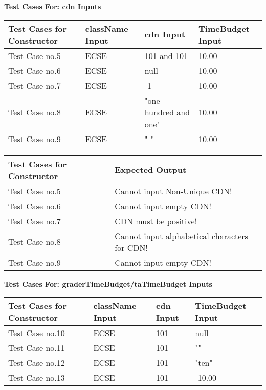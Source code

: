 \documentclass[12pt]{report}
\begin{document}
	\textbf{Test Cases For: cdn Inputs}
	\begin{flushleft}
		\begin{tabular}{ | l | l | l | l | }
			\hline
			Test Cases for Constructor & className Input & cdn Input & TimeBudget Input \\ \hline
			Test Case no.5 & ECSE & 101 and 101 & 10.00 \\ \hline
			Test Case no.6 & ECSE & null & 10.00 \\ \hline
			Test Case no.7 & ECSE & -1 & 10.00 \\ \hline
			Test Case no.8 & ECSE & "one hundred and one" & 10.00 \\ \hline
			Test Case no.9 & ECSE & " " & 10.00 \\ \hline
		\end{tabular}
	\end{flushleft}
	
	\begin{flushleft}
		\begin{tabular}{ | l | l | }
			\hline
			Test Cases for Constructor & Expected Output \\ \hline
			Test Case no.5 & Cannot input Non-Unique CDN! \\ \hline
			Test Case no.6 & Cannot input empty CDN! \\ \hline
			Test Case no.7 & CDN must be positive! \\ \hline
			Test Case no.8 & Cannot input alphabetical characters for CDN!  \\ \hline
			Test Case no.9 & Cannot input empty CDN!  \\ \hline			
		\end{tabular}
	\end{flushleft}

	\textbf{Test Cases For: graderTimeBudget/taTimeBudget Inputs} 
	\begin{flushleft}
		\begin{tabular}{ | l | l | l | l | }
			\hline
			Test Cases for Constructor & className Input & cdn Input & TimeBudget Input \\ \hline
			Test Case no.10 & ECSE & 101 & null \\ \hline
			Test Case no.11 & ECSE & 101 & "" \\ \hline
			Test Case no.12 & ECSE & 101 & "ten" \\ \hline
			Test Case no.13 & ECSE & 101 & -10.00 \\ \hline
		\end{tabular}
	\end{flushleft}
	
\end{document}
